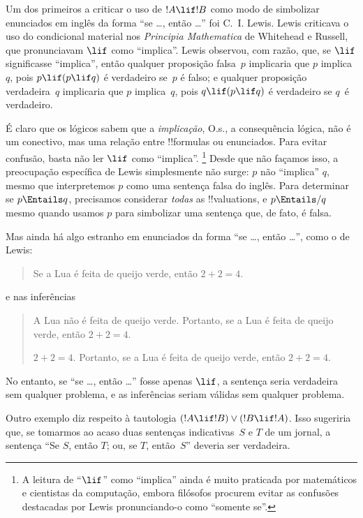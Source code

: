 \documentclass[../../../include/open-logic-section]{subfiles}
\begin{document}


Um dos primeiros a criticar o uso de $!A \lif !B$ como modo de
simbolizar enunciados em inglês da forma ``se \dots, então \dots'' foi
C.~I. Lewis. Lewis criticava o uso do condicional material nos
\emph{Principia Mathematica} de Whitehead e Russell, que
pronunciavam $\lif$ como ``implica''. Lewis observou, com razão, que, se
$\lif$ significasse ``implica'', então qualquer proposição falsa~$p$ implicaria que
$p$ implica~$q$, pois $p \lif (p \lif q)$ é verdadeiro se~$p$ é falso;
e qualquer proposição verdadeira~$q$ implicaria que $p$ implica~$q$, pois
$q \lif (p \lif q)$ é verdadeiro se $q$~é verdadeiro.

É claro que os lógicos sabem que a \emph{implicação}, O.s.\@, a
consequência lógica, não é um conectivo, mas uma relação entre !!{formula}s ou
enunciados. Para evitar confusão, basta não ler $\lif$ como ``implica''.
\footnote{A leitura de ``$\lif$'' como ``implica'' ainda é muito
  praticada por matemáticos e cientistas da computação, embora
  filósofos procurem evitar as confusões destacadas por Lewis
  pronunciando-o como ``somente se''.} Desde que não façamos isso, a preocupação
específica de Lewis simplesmente não surge: $p$ não ``implica'' $q$,
mesmo que interpretemos $p$ como uma sentença falsa do inglês. Para
determinar se $p \Entails q$, precisamos considerar \emph{todas} as
!!{valuation}s, e $p \Entails/ q$ mesmo quando usamos $p$ para simbolizar
uma sentença que, de fato, é falsa.

Mas ainda há algo estranho em enunciados da forma ``se \dots,
então \dots'', como o de Lewis:
\begin{quote}
Se a Lua é feita de queijo verde, então $2+2=4$.
\end{quote}
e nas inferências
\begin{quote}
  A Lua não é feita de queijo verde. Portanto, se a Lua é feita
  de queijo verde, então $2+2=4$.

  $2+2 = 4$. Portanto, se a Lua é feita
  de queijo verde, então $2+2=4$.
\end{quote}
No entanto, se ``se \dots, então \dots'' fosse apenas $\lif$, a sentença seria
verdadeira sem qualquer problema, e as inferências seriam válidas sem qualquer problema.

Outro exemplo diz respeito à tautologia $(!A \lif !B) \lor (!B \lif
!A)$. Isso sugeriria que, se tomarmos ao acaso duas sentenças
indicativas~$S$ e $T$ de um jornal, a sentença ``Se
$S$, então $T$; ou, se $T$, então~$S$'' deveria ser verdadeira.
\end{document}
